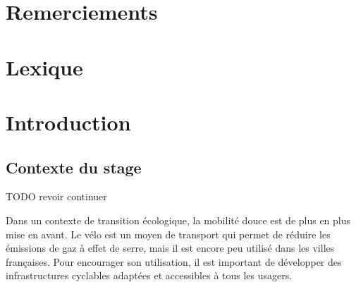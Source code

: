 \documentclass[a4paper,12pt,french]{article}
\begin{document}


\clearpage
\hfill
\clearpage

\section*{Remerciements}




\newpage
\tableofcontents
\newpage

\section{Lexique}

\setlength{\parskip}{1em}

\section{Introduction}
\subsection{Contexte du stage}

TODO revoir continuer 

Dans un contexte de transition écologique, la mobilité douce est de plus en plus mise en avant. Le vélo est un moyen de transport qui permet de réduire les émissions de gaz à effet de serre, mais il est encore peu utilisé dans les villes françaises. Pour encourager son utilisation, il est important de développer des infrastructures cyclables adaptées et accessibles à tous les usagers.
\end{document}
